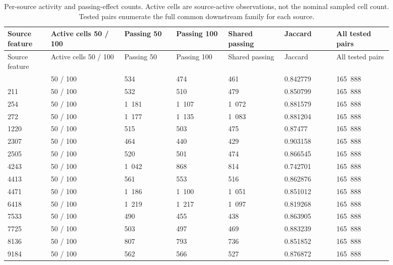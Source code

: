 \begin{longtable}{@{}L{0.1\linewidth}L{0.17\linewidth}L{0.12\linewidth}L{0.12\linewidth}L{0.13\linewidth}L{0.12\linewidth}L{0.13\linewidth}@{}}
\caption{Per-source activity and passing-effect counts. Active cells are source-active observations, not the nominal sampled cell count. Tested pairs enumerate the full common downstream family for each source.}\\
\toprule
Source feature & Active cells 50 / 100 & Passing 50 & Passing 100 & Shared passing & Jaccard & All tested pairs \\
\midrule
\endfirsthead
\toprule
Source feature & Active cells 50 / 100 & Passing 50 & Passing 100 & Shared passing & Jaccard & All tested pairs \\
\midrule
\endhead
\endfoot
\bottomrule
{} & 50 / 100 & 534 & 474 & 461 & 0.842779 & 165~888 \\
211 & 50 / 100 & 532 & 510 & 479 & 0.850799 & 165~888 \\
254 & 50 / 100 & 1~181 & 1~107 & 1~072 & 0.881579 & 165~888 \\
272 & 50 / 100 & 1~177 & 1~135 & 1~083 & 0.881204 & 165~888 \\
1220 & 50 / 100 & 515 & 503 & 475 & 0.87477 & 165~888 \\
2307 & 50 / 100 & 464 & 440 & 429 & 0.903158 & 165~888 \\
2505 & 50 / 100 & 520 & 501 & 474 & 0.866545 & 165~888 \\
4243 & 50 / 100 & 1~042 & 868 & 814 & 0.742701 & 165~888 \\
4413 & 50 / 100 & 561 & 553 & 516 & 0.862876 & 165~888 \\
4471 & 50 / 100 & 1~186 & 1~100 & 1~051 & 0.851012 & 165~888 \\
6418 & 50 / 100 & 1~219 & 1~217 & 1~097 & 0.819268 & 165~888 \\
7533 & 50 / 100 & 490 & 455 & 438 & 0.863905 & 165~888 \\
7725 & 50 / 100 & 503 & 497 & 469 & 0.883239 & 165~888 \\
8136 & 50 / 100 & 807 & 793 & 736 & 0.851852 & 165~888 \\
9184 & 50 / 100 & 562 & 566 & 527 & 0.876872 & 165~888 \\
\end{longtable}
